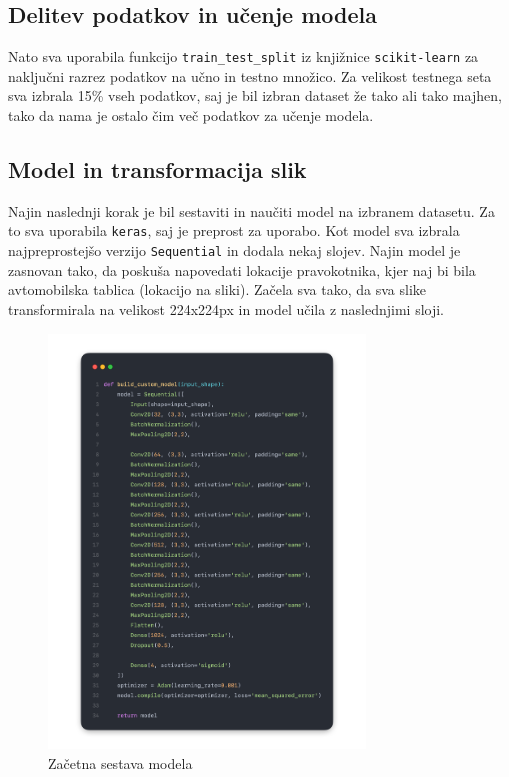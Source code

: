\documentclass[a4paper,12pt]{article}
\begin{document}
\pagebreak

\subsection*{Delitev podatkov in učenje modela}
Nato sva uporabila funkcijo \texttt{train\_test\_split} iz knjižnice \texttt{scikit-learn} za naključni razrez podatkov na učno in testno množico. Za velikost testnega seta sva izbrala 15\% vseh podatkov, saj je bil izbran dataset že tako ali tako majhen, tako da nama je ostalo čim več podatkov za učenje modela.

\subsection*{Model in transformacija slik}
Najin naslednji korak je bil sestaviti in naučiti model na izbranem datasetu. Za to sva uporabila \texttt{keras}, saj je preprost za uporabo. Kot model sva izbrala najpreprostejšo verzijo \texttt{Sequential} in dodala nekaj slojev. Najin model je zasnovan tako, da poskuša napovedati lokacije pravokotnika, kjer naj bi bila avtomobilska tablica (lokacijo na sliki). Začela sva tako, da sva slike transformirala na velikost 224x224px in model učila z naslednjimi sloji.

\begin{figure}[H]
    \centering
    \includegraphics[width=0.75\textwidth]{img/build_custom_model1.png}
    \caption{Začetna sestava modela}
\end{figure}
\end{document}

